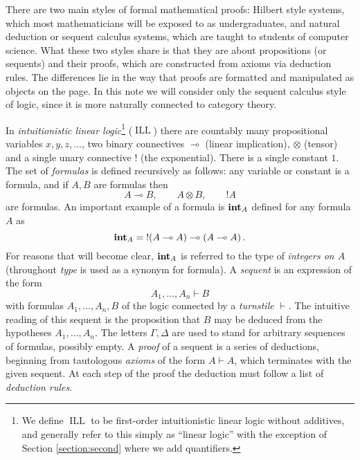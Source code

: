 \documentclass[english,letter paper,12pt,reqno]{article}
\theoremstyle{example}
\numberwithin{equation}{section}
\DeclareMathOperator{\ILL}{ILL}
\def\inta{\bold{int}}
\begin{document}

There are two main styles of formal mathematical proofs: Hilbert style systems, which most mathematicians will be exposed to as undergraduates, and natural deduction or sequent calculus systems, which are taught to students of computer science. What these two styles share is that they are about propositions (or sequents) and their proofs, which are constructed from axioms via deduction rules. The differences lie in the way that proofs are formatted and manipulated as objects on the page. In this note we will consider only the sequent calculus style of logic, since it is more naturally connected to category theory.

In \emph{intuitionistic linear logic}\footnote{We define $\ILL$ to be first-order intuitionistic linear logic without additives, and generally refer to this simply as ``linear logic'' with the exception of Section \ref{section:second} where we add quantifiers.} ($\ILL$) there are countably many propositional variables $x,y,z,\ldots$, two binary connectives $\multimap$ (linear implication), $\otimes$ (tensor) and a single unary connective $!$ (the exponential). There is a single constant $1$. The set of \emph{formulas} is defined recursively as follows: any variable or constant is a formula, and if $A,B$ are formulas then
\[
A \multimap B, \qquad A \otimes B, \qquad {!}A
\]
are formulas. An important example of a formula is $\inta_A$ defined for any formula $A$ as
\begin{equation}\label{defn:integers} 
\inta_A = {!}( A \multimap A) \multimap (A \multimap A)\,.
\end{equation}
For reasons that will become clear, $\inta_A$ is referred to the type of \emph{integers on $A$} (throughout \emph{type} is used as a synonym for formula). A \emph{sequent} is an expression of the form
\[
A_1,\ldots,A_n \vdash B
\]
with formulas $A_1,\ldots,A_n, B$ of the logic connected by a \emph{turnstile} $\vdash$. The intuitive reading of this sequent is the proposition that $B$ may be deduced from the hypotheses $A_1,\ldots,A_n$. The letters $\Gamma, \Delta$ are used to stand for arbitrary sequences of formulas, possibly empty. A \emph{proof} of a sequent is a series of deductions, beginning from tautologous \emph{axioms} of the form $A \vdash A$, which terminates with the given sequent. At each step of the proof the deduction must follow a list of \emph{deduction rules}. 
\end{document}
